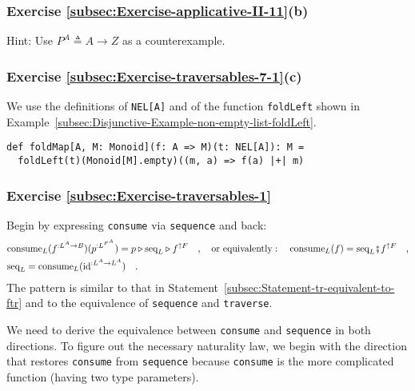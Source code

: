 \subsubsection*{Exercise \ref{subsec:Exercise-applicative-II-11}(b)}

Hint: Use $P^{A}\triangleq A\rightarrow Z$ as a counterexample.


\subsubsection*{Exercise \ref{subsec:Exercise-traversables-7-1}(c)}

We use the definitions of \lstinline!NEL[A]! and of the function
\lstinline!foldLeft! shown in Example~\ref{subsec:Disjunctive-Example-non-empty-list-foldLeft}.
\begin{lstlisting}
def foldMap[A, M: Monoid](f: A => M)(t: NEL[A]): M =
  foldLeft(t)(Monoid[M].empty)((m, a) => f(a) |+| m)
\end{lstlisting}


\subsubsection*{Exercise \ref{subsec:Exercise-traversables-1}}

Begin by expressing \lstinline!consume! via \lstinline!sequence!
and back:
\begin{align}
 & \text{consume}_{L}(f^{:L^{A}\rightarrow B})(p^{:L^{F^{A}}})=p\triangleright\text{seq}_{L}\triangleright f^{\uparrow F}\quad,\quad\text{or equivalently}:\quad\text{consume}_{L}(f)=\text{seq}_{L}\bef f^{\uparrow F}\quad,\label{eq:consume-via-seq}\\
 & \text{seq}_{L}=\text{consume}_{L}(\text{id}^{:L^{A}\rightarrow L^{A}})\quad.\label{eq:seq-via-consume}
\end{align}
The pattern is similar to that in Statement~\ref{subsec:Statement-tr-equivalent-to-ftr}
and to the equivalence of \lstinline!sequence! and \lstinline!traverse!.

We need to derive the equivalence between \lstinline!consume! and
\lstinline!sequence! in both directions. To figure out the necessary
naturality law, we begin with the direction that restores \lstinline!consume!
from \lstinline!sequence! because \lstinline!consume! is the more
complicated function (having two type parameters).

